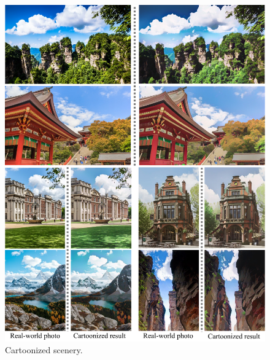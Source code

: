 \documentclass[10pt,twocolumn,letterpaper]{article}
\begin{document}
\begin{figure}[b]
\centering
\includegraphics[width=\linewidth]{figures/scenery1.pdf}
\caption{Cartoonized scenery.}
\label{fig:scenery1}
\end{figure}
\end{document}
